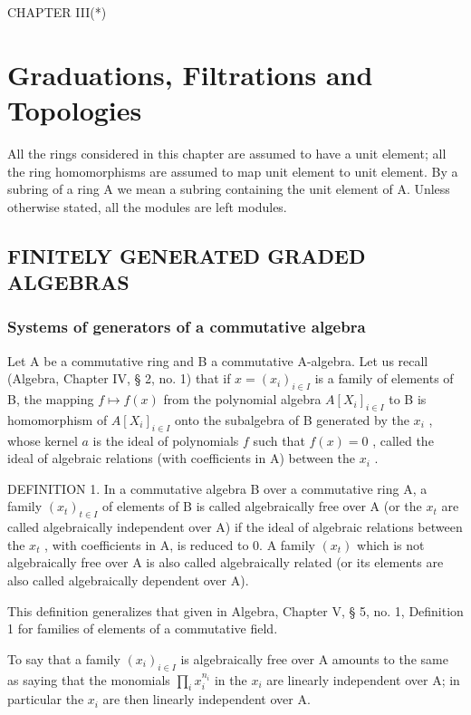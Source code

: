 CHAPTER III(*)

\chapter{Graduations, Filtrations and Topologies}

All the rings considered in this chapter are assumed to have a unit element; all the ring homomorphisms are assumed to map unit element to unit element. By a subring of a ring A we mean a subring containing the unit element of A. Unless otherwise stated, all the modules are left modules.

\section{FINITELY GENERATED GRADED ALGEBRAS}

\subsection{Systems of generators of a commutative algebra}

Let A be a commutative ring and B a commutative A-algebra. Let us recall (Algebra, Chapter IV, § 2, no. 1) that if \(x = (x_{i})_{i \in I}\) is a family of elements of B, the mapping \(f \mapsto f(x)\) from the polynomial algebra \(A[X_{i}]_{i \in I}\) to B is homomorphism of \(A[X_{i}]_{i \in I}\) onto the subalgebra of B generated by the \(x_{i}\) , whose kernel \(a\) is the ideal of polynomials \(f\) such that \(f(x) = 0\) , called the ideal of algebraic relations (with coefficients in A) between the \(x_{i}\) .

DEFINITION 1. In a commutative algebra B over a commutative ring A, a family \((x_{t})_{t\in I}\) of elements of B is called algebraically free over A (or the \(x_{t}\) are called algebraically independent over A) if the ideal of algebraic relations between the \(x_{t}\) , with coefficients in A, is reduced to 0. A family \((x_{t})\) which is not algebraically free over A is also called algebraically related (or its elements are also called algebraically dependent over A).

This definition generalizes that given in Algebra, Chapter V, § 5, no. 1, Definition 1 for families of elements of a commutative field.

To say that a family \((x_{i})_{i\in I}\) is algebraically free over A amounts to the same as saying that the monomials \(\prod_{i}x_{i}^{n_{i}}\) in the \(x_{i}\) are linearly independent over A; in particular the \(x_{i}\) are then linearly independent over A.

